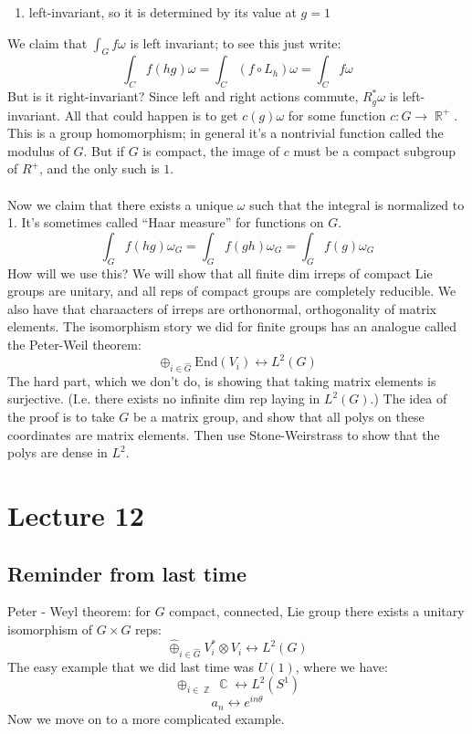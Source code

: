 \documentclass[12 pt]{article}
\DeclareMathOperator {\R} {\mathbb{R}}
\DeclareMathOperator {\C} {\mathbb{C}}
\DeclareMathOperator {\Z} {\mathbb{Z}}
\theoremstyle{plain}
\theoremstyle{definition}
\theoremstyle{remark}
\begin{document}
\begin{enumerate}
\item left-invariant, so it is determined by its value at $g=1$
\end{enumerate}
We claim that $\int_G f \omega$ is left invariant; to see this just write:
\[        \int_C f(hg) \omega = \int_C (f\circ L_h) \omega = \int_C f \omega     \]
But is it right-invariant? Since left and right actions commute, $R_g^*\omega$ is left-invariant. All that could happen is to get $c(g) \omega$ for some function $c : G \to \R^+$. This is a group homomorphism; in general it's a nontrivial function called the modulus of $G$. But if $G$ is compact, the image of $c$ must be a compact subgroup of $R^+$, and the only such is $1$.
\\
\\
Now we claim that there exists a unique $\omega$ such that the integral is normalized to 1. It's sometimes called ``Haar measure'' for functions on $G$.
\[      \int_G f(hg) \omega_G = \int_G f(gh) \omega_G = \int_G f(g) \omega_G      \]
How will we use this? We will show that all finite dim irreps of compact Lie groups are unitary, and all reps of compact groups are completely reducible. We also have that charaacters of irreps are orthonormal, orthogonality of matrix elements. The isomorphism story we did for finite groups has an analogue called the Peter-Weil theorem:
\[       \oplus_{i\in \hat G} \text{End}(V_i) \longleftrightarrow L^2(G)       \]
The hard part, which we don't do, is showing that taking matrix elements is surjective. (I.e. there exists no infinite dim rep laying in $L^2(G)$.) The idea of the proof is to take $G$ be a matrix group, and show that all polys on these coordinates are matrix elements. Then use Stone-Weirstrass to show that the polys are dense in $L^2$.

\section*{Lecture 12}
\subsection*{Reminder from last time}
Peter - Weyl theorem: for $G$ compact, connected, Lie group there exists a unitary isomorphism of $G\times G$ reps:
\[      \hat \oplus_{i \in \hat G} V_i^* \otimes V_i  \longleftrightarrow L^2(G)     \]
The easy example that we did last time was $U(1)$, where we have:
\[      \oplus_{i\in \Z} \C \longleftrightarrow L^2(S^1)       \]
\[        a_n \longleftrightarrow e^{in\theta}     \]
Now we move on to a more complicated example.
\end{document}
